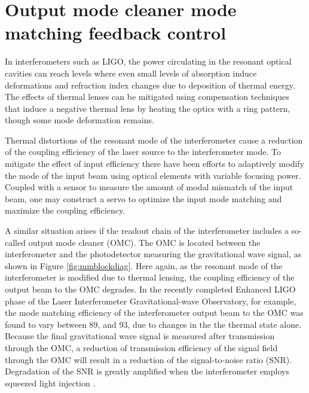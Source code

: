 \chapter{Output mode cleaner mode matching feedback control}
\label{ch:modematching}
In interferometers such as LIGO, the power circulating in the resonant optical cavities can reach levels where even small levels of absorption induce deformations and refraction index changes due to deposition of thermal energy\cite{absorptionheating}. %
The effects of thermal lenses can be mitigated using compensation techniques that induce a negative thermal lens by heating the optics with a ring pattern, though some mode deformation remains\cite{aLIGOTCS}. %


Thermal distortions of the resonant mode of the interferometer cause a reduction of the coupling efficiency of the laser source to the interferometer mode. %
To mitigate the effect of input efficiency there have been efforts to adaptively modify the mode of the input beam using optical elements with variable focusing power. %
Coupled with a sensor to measure the amount of modal mismatch of the input beam, one may construct a servo to optimize the input mode matching and maximize the coupling efficiency\cite{Arain:10,fan:104501,Mueller:00}.

A similar situation arises if the readout chain of the interferometer includes a so-called output mode cleaner (OMC). %
The OMC is located between the interferometer and the photodetector measuring the gravitational wave signal, as shown in Figure \ref{fig:mmblockdiag}. %
Here again, as the resonant mode of the interferometer is modified due to  thermal lensing, the coupling efficiency of the output beam to the OMC degrades. %
In the recently completed Enhanced LIGO phase of the Laser Interferometer Gravitational-wave Observatory, for example, the mode matching efficiency of the interferometer output beam to the OMC was found to vary between 89\perc{}, and 93\perc{}, due to changes in the the thermal state alone\cite{DooleyMMDoc}. %
Because the final gravitational wave signal is measured after transmission through the OMC, a reduction of transmission efficiency of the signal field through the OMC will result in a reduction of the signal-to-noise ratio (SNR). %
 Degradation of the SNR is greatly amplified when the interferometer employs squeezed light injection \cite{GEOSqz:11}.


